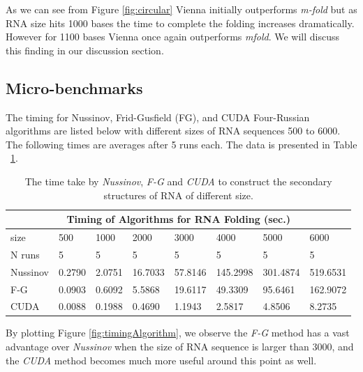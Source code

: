 \documentclass[12pt]{article}
\begin{document}
As we can see from Figure \ref{fig:circular} Vienna initially outperforms \textit{m-fold} but as RNA size hits 1000 bases the time to
complete the folding increases dramatically. However for 1100 bases Vienna once again outperforms \textit{mfold}. We will discuss this finding in our discussion section.

\subsection{Micro-benchmarks}
The timing for Nussinov, Frid-Gusfield (FG), and CUDA Four-Russian algorithms are listed below with
different sizes of RNA sequences 500 to 6000. The following times are averages after 5 runs each.
The data is presented in Table ~\ref{table:timingAlgorithm}.\\
\begin{table}[H]
\begin{center}
    \begin{tabular}{ |p{1.5cm}||p{1.2cm}|p{1.3cm}|p{1.3cm}|p{1.4cm}|p{1.4cm}|p{1.4cm}|p{1.6cm}|}
     \hline
     \multicolumn{8}{|c|}{Timing of Algorithms for RNA Folding (sec.)} \\
     \hline
     size& 500& 1000& 2000& 3000& 4000& 5000& 6000\\
     \hline
     N runs& 5& 5& 5& 5& 5& 5& 5\\
     \hline
     Nussinov& 0.2790& 2.0751& 16.7033& 57.8146& 145.2998& 301.4874& 519.6531\\
     F-G& 0.0903& 0.6092& 5.5868& 19.6117& 49.3309& 95.6461& 162.9072\\
     CUDA& 0.0088& 0.1988& 0.4690& 1.1943& 2.5817& 4.8506& 8.2735\\
     \hline
    \end{tabular}
\end{center}
\caption{The time take by \textit{Nussinov}, \textit{F-G} and \textit{CUDA} to construct the secondary structures of RNA of different size.}
\label{table:timingAlgorithm}
\end{table}
\par By plotting Figure \ref{fig:timingAlgorithm}, we observe the \textit{F-G} method has a vast advantage
over \textit{Nussinov} when the size of RNA sequence is larger than 3000, and the \textit{CUDA} method
becomes much more useful around this point as well.
\end{document}
